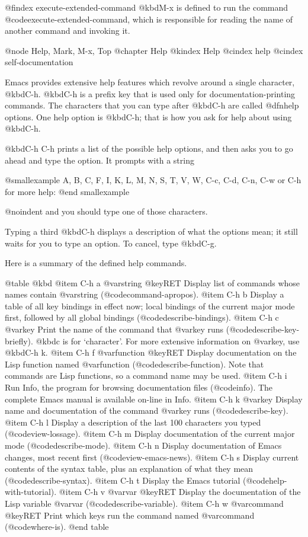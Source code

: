 {{{{{{@findex execute-extended-command
  @kbd{M-x} is defined to run the command @code{execute-extended-command},
which is responsible for reading the name of another command and invoking
it.

@node Help, Mark, M-x, Top
@chapter Help
@kindex Help
@cindex help
@cindex self-documentation

  Emacs provides extensive help features which revolve around a single
character, @kbd{C-h}.  @kbd{C-h} is a prefix key that is used only for
documentation-printing commands.  The characters that you can type after
@kbd{C-h} are called @dfn{help options}.  One help option is @kbd{C-h};
that is how you ask for help about using @kbd{C-h}.

  @kbd{C-h C-h} prints a list of the possible help options, and then asks
you to go ahead and type the option.  It prompts with a string

@smallexample
A, B, C, F, I, K, L, M, N, S, T, V, W, C-c, C-d, C-n, C-w or C-h for more help:
@end smallexample

@noindent
and you should type one of those characters.

  Typing a third @kbd{C-h} displays a description of what the options mean;
it still waits for you to type an option.  To cancel, type @kbd{C-g}.

  Here is a summary of the defined help commands.

@table @kbd
@item C-h a @var{string} @key{RET}
Display list of commands whose names contain @var{string}
(@code{command-apropos}).
@item C-h b
Display a table of all key bindings in effect now; local bindings of
the current major mode first, followed by all global bindings
(@code{describe-bindings}).
@item C-h c @var{key}
Print the name of the command that @var{key} runs (@code{describe-key-briefly}).
@kbd{c} is for `character'.  For more extensive information on @var{key},
use @kbd{C-h k}.
@item C-h f @var{function} @key{RET}
Display documentation on the Lisp function named @var{function}
(@code{describe-function}).  Note that commands are Lisp functions, so
a command name may be used.
@item C-h i
Run Info, the program for browsing documentation files (@code{info}).
The complete Emacs manual is available on-line in Info.
@item C-h k @var{key}
Display name and documentation of the command @var{key} runs (@code{describe-key}).
@item C-h l
Display a description of the last 100 characters you typed
(@code{view-lossage}).
@item C-h m
Display documentation of the current major mode (@code{describe-mode}).
@item C-h n
Display documentation of Emacs changes, most recent first
(@code{view-emacs-news}).
@item C-h s
Display current contents of the syntax table, plus an explanation of
what they mean (@code{describe-syntax}).
@item C-h t
Display the Emacs tutorial (@code{help-with-tutorial}).
@item C-h v @var{var} @key{RET}
Display the documentation of the Lisp variable @var{var}
(@code{describe-variable}).
@item C-h w @var{command} @key{RET}
Print which keys run the command named @var{command} (@code{where-is}).
@end table

}}}}}}
